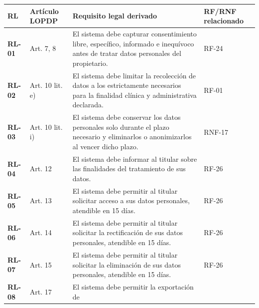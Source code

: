 \documentclass[
]{article}
\newcounter{none} %
\begin{document}
{\def\LTcaptype{none} %
\begin{longtable}[]{@{}
  >{\raggedright\arraybackslash}p{}
  >{\raggedright\arraybackslash}p{}
  >{\raggedright\arraybackslash}p{}
  >{\raggedright\arraybackslash}p{}@{}}
\toprule\noalign{}
\begin{minipage}[b]{\linewidth}\raggedright
\textbf{RL}
\end{minipage} & \begin{minipage}[b]{\linewidth}\raggedright
\textbf{Artículo LOPDP}
\end{minipage} & \begin{minipage}[b]{\linewidth}\raggedright
\textbf{Requisito legal derivado}
\end{minipage} & \begin{minipage}[b]{\linewidth}\raggedright
\textbf{RF/RNF relacionado}
\end{minipage} \\
\midrule\noalign{}
\endhead
\bottomrule\noalign{}
\endlastfoot
\textbf{RL-01} & Art. 7, 8 & El sistema debe capturar consentimiento
libre, específico, informado e inequívoco antes de tratar datos
personales del propietario. & RF-24 \\
\textbf{RL-02} & Art. 10 lit. e) & El sistema debe limitar la
recolección de datos a los estrictamente necesarios para la finalidad
clínica y administrativa declarada. & RF-01 \\
\textbf{RL-03} & Art. 10 lit. i) & El sistema debe conservar los datos
personales solo durante el plazo necesario y eliminarlos o anonimizarlos
al vencer dicho plazo. & RNF-17 \\
\textbf{RL-04} & Art. 12 & El sistema debe informar al titular sobre las
finalidades del tratamiento de sus datos. & RF-26 \\
\textbf{RL-05} & Art. 13 & El sistema debe permitir al titular solicitar
acceso a sus datos personales, atendible en 15 días. & RF-26 \\
\textbf{RL-06} & Art. 14 & El sistema debe permitir al titular solicitar
la rectificación de sus datos personales, atendible en 15 días. &
RF-26 \\
\textbf{RL-07} & Art. 15 & El sistema debe permitir al titular solicitar
la eliminación de sus datos personales, atendible en 15 días. & RF-26 \\
\textbf{RL-08} & Art. 17 & El sistema debe permitir la exportación de

\end{longtable}}
\end{document}
